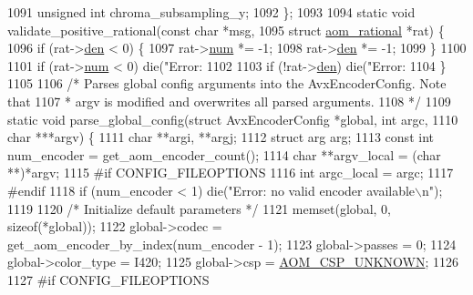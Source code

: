 \begin{DoxyCodeInclude}
{{{{{{{{{1091   \textcolor{keywordtype}{unsigned} \textcolor{keywordtype}{int} chroma\_subsampling\_y;
1092 \};
1093 
1094 \textcolor{keyword}{static} \textcolor{keywordtype}{void} validate\_positive\_rational(\textcolor{keyword}{const} \textcolor{keywordtype}{char} *msg,
1095                                        \textcolor{keyword}{struct} \hyperlink{structaom__rational}{aom\_rational} *rat) \{
1096   \textcolor{keywordflow}{if} (rat->\hyperlink{structaom__rational_adeddf2ea01c12b7be66536e0a0fb92c5}{den} < 0) \{
1097     rat->\hyperlink{structaom__rational_a7b48174411798c780a15f132c4650839}{num} *= -1;
1098     rat->\hyperlink{structaom__rational_adeddf2ea01c12b7be66536e0a0fb92c5}{den} *= -1;
1099   \}
1100 
1101   \textcolor{keywordflow}{if} (rat->\hyperlink{structaom__rational_a7b48174411798c780a15f132c4650839}{num} < 0) die(\textcolor{stringliteral}{"Error: %
1102 
1103   \textcolor{keywordflow}{if} (!rat->\hyperlink{structaom__rational_adeddf2ea01c12b7be66536e0a0fb92c5}{den}) die(\textcolor{stringliteral}{"Error: %
1104 \}
1105 
1106 \textcolor{comment}{/* Parses global config arguments into the AvxEncoderConfig. Note that}
1107 \textcolor{comment}{ * argv is modified and overwrites all parsed arguments.}
1108 \textcolor{comment}{ */}
1109 \textcolor{keyword}{static} \textcolor{keywordtype}{void} parse\_global\_config(\textcolor{keyword}{struct} AvxEncoderConfig *global, \textcolor{keywordtype}{int} argc,
1110                                 \textcolor{keywordtype}{char} ***argv) \{
1111   \textcolor{keywordtype}{char} **argi, **argj;
1112   \textcolor{keyword}{struct }arg arg;
1113   \textcolor{keyword}{const} \textcolor{keywordtype}{int} num\_encoder = get\_aom\_encoder\_count();
1114   \textcolor{keywordtype}{char} **argv\_local = (\textcolor{keywordtype}{char} **)*argv;
1115 \textcolor{preprocessor}{#if CONFIG\_FILEOPTIONS}
1116   \textcolor{keywordtype}{int} argc\_local = argc;
1117 \textcolor{preprocessor}{#endif}
1118   \textcolor{keywordflow}{if} (num\_encoder < 1) die(\textcolor{stringliteral}{"Error: no valid encoder available\(\backslash\)n"});
1119 
1120   \textcolor{comment}{/* Initialize default parameters */}
1121   memset(global, 0, \textcolor{keyword}{sizeof}(*global));
1122   global->codec = get\_aom\_encoder\_by\_index(num\_encoder - 1);
1123   global->passes = 0;
1124   global->color\_type = I420;
1125   global->csp = \hyperlink{aom__image_8h_a10590253ef3dbde7e93ed5d4b4e0e73ba7843506f3e28f720be0d4f03237fb48c}{AOM\_CSP\_UNKNOWN};
1126 
1127 \textcolor{preprocessor}{#if CONFIG\_FILEOPTIONS}
}}}}}}}}}}}
\end{DoxyCodeInclude}

